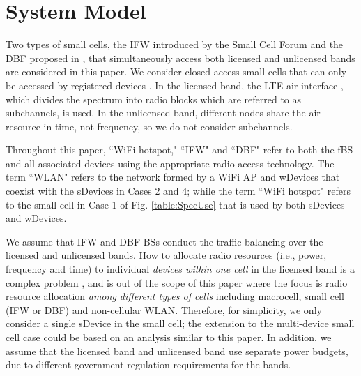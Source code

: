 \documentclass[journal,final,letterpaper,10pt,doublecolumn,twoside]{IEEEtran}
\begin{document}
\section{System Model}\label{sec:systemModel}



Two types of small cells, the IFW
\cite{femto-forum-IFW} introduced by the Small Cell Forum and the DBF
proposed in \cite{feilu_femto_accessScheme}\cite{huawei_unlic_LTE}, that simultaneously access both licensed and
unlicensed bands are considered in this paper.
We consider closed access small cells
that can only be accessed by registered devices
\cite{femto_Survey_JeffAndrews2008}.  In the licensed band, the LTE
air interface \cite{LTE-A}, which divides the spectrum into radio
blocks which are referred to as subchannels, is used. In the unlicensed band, different nodes share the air resource in time, not frequency, so we do not consider subchannels.

Throughout this
paper, ``WiFi hotspot," ``IFW" and ``DBF" refer to both the fBS and
all associated devices using the appropriate radio access technology. The term ``WLAN" refers to the network formed by a WiFi AP and wDevices that coexist with the sDevices in Cases 2 and 4; while the term ``WiFi hotspot" refers to the small cell in Case 1 of Fig. \ref{table:SpecUse} that is used by both sDevices and wDevices.


We assume that IFW
and DBF BSs conduct the traffic balancing over the
licensed and unlicensed bands.
How to allocate radio resources
(i.e., power, frequency and time) to individual \emph{devices within
one cell} in the licensed band is a complex problem \cite{ofdm_multiuser}, and is out of
the scope of this paper where the focus is radio resource allocation
\emph{among different types of cells} including macrocell, small
cell (IFW or DBF) and non-cellular WLAN. Therefore, for simplicity,
we only consider a single sDevice in the small cell; the extension to
the multi-device small cell case could be based on an analysis similar
to this paper. In addition, we assume that the licensed band and unlicensed band use separate power budgets, due to different government regulation requirements for the bands.
\end{document}
